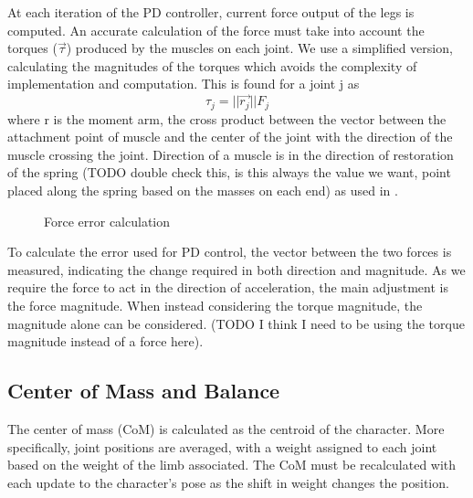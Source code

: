 At each iteration of the PD controller, current force output of the legs is computed.  An accurate calculation of the force must take into account the torques ($\vec{\tau}$) produced by the muscles on each joint.  We use a simplified version, calculating the magnitudes of the torques which avoids the complexity of implementation and computation.  This is found for a joint j as \[\tau_j = ||\vec{r_j}|| F_j\] where r is the moment arm, the cross product between the vector between the attachment point of muscle and the center of the joint with the direction of the muscle crossing the joint.  Direction of a muscle is in the direction of restoration of the spring (TODO double check this, is this always the value we want, point placed along the spring based on the masses on each end) as used in \cite{muscle_based_bipeds}.

\begin{figure}[ht]
	\centering
	\caption[Algorithm diagram for calculation of force error]{Force error calculation}
	\label{fig:forceErr}
\end{figure}

To calculate the error used for PD control, the vector between the two forces is measured, indicating the change required in both direction and magnitude.  As we require the force to act in the direction of acceleration, the main adjustment is the force magnitude.  When instead considering the torque magnitude, the magnitude alone can be considered. (TODO I think I need to be using the torque magnitude instead of a force here).

\subsection{Center of Mass and Balance}
The center of mass (CoM) is calculated as the centroid of the character.  More specifically, joint positions are averaged, with a weight assigned to each joint based on the weight of the limb associated.  The CoM must be recalculated with each update to the character's pose as the shift in weight changes the position.

